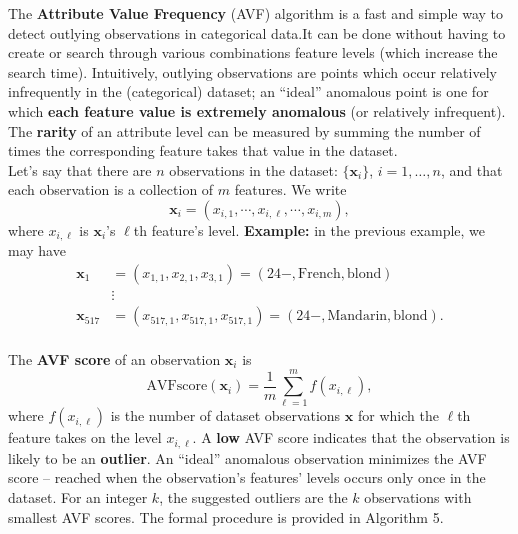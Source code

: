 \documentclass[20pt,landscape,footrule,headrule]{foils}
\newcommand{\newl}{\newline\newline}
\def\fh{\foilhead}
\begin{document}
{{\fh{6.3.1 -- AVF Algorithm} \label{6.3.1} 
\noindent The \textbf{Attribute Value Frequency} (AVF) algorithm is a fast and simple way to detect outlying observations in categorical data.\newl It can be done without having to create or search through various combinations feature levels (which increase the search time).  \newline\newline Intuitively, outlying observations are points which occur relatively infrequently in the (categorical) dataset;  an ``ideal'' anomalous point is one for which  \textbf{each feature value is extremely anomalous} (or relatively infrequent). 
\newline\newline The \textbf{rarity} of an attribute level can be measured by summing the number of times the corresponding feature takes that value in the dataset. 
\newpage\ \\ \noindent Let's say that there are $n$ observations in the dataset: $\{\mathbf{x}_i\}$, $i = 1, \ldots, n$, and that each observation is a collection of $m$ features. \newl We write $$\mathbf{x}_{i} = (x_{i,1}, \cdots , x_{i,\ell}, \cdots, x_{i,m}),$$ where  $x_{i,\ell}$ is $\mathbf{x}_i$'s $\ell$th feature's level.\newl 
\textbf{Example:} in the previous example, we may have \begin{align*} \mathbf{x}_1&=(x_{1,1},x_{2,1},x_{3,1})=(24-,\text{French},\text{blond}) \\ &\vdots \\  \mathbf{x}_{517}&=(x_{517,1},x_{517,1},x_{517,1})=(24-,\text{Mandarin},\text{blond}).\end{align*}
\newpage\ \\ \noindent The \textbf{AVF score} of an observation $\textbf{x}_i$ is
$$\text{AVFscore}(\mathbf{x}_i) = \frac{1}{m} \sum_{\ell=1}^{m}f(x_{i,\ell}),$$
where $f(x_{i,\ell})$ is the number of dataset observations $\mathbf{x}$ for which the  $\ell$th feature takes on the level ${x}_{i,\ell}$. \newl A \textbf{low} AVF score indicates that the observation is  likely to be an \textbf{outlier}. 
\newline\newline An ``ideal'' anomalous observation minimizes the AVF score -- reached when the observation's features' levels occurs only once in the dataset.
\newl For an integer $k$, the suggested  outliers are the $k$ observations with smallest AVF scores. The formal procedure is provided in Algorithm 5.
\newpage
}}
\end{document}
